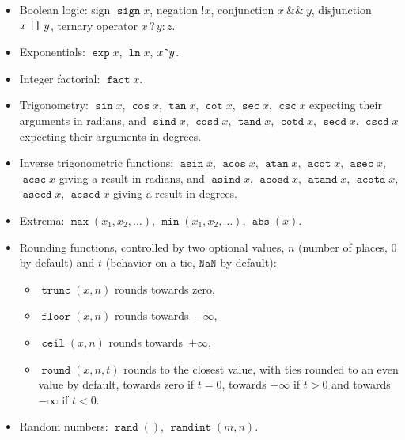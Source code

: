 \documentclass{ltxguide}
\providecommand\fpop[1]{\mathop{\texttt{#1}}}
\providecommand\fprel[1]{\mathrel{\texttt{#1}}}
\providecommand\nan{\texttt{NaN}}
\begin{document}
\begin{itemize}
    The relation $x\fprel{?}y$ is true exactly if one or both operands is~\nan{} or is
   a tuple, unless they are equal tuples. Each 
   can be any (non-empty) combination of |<|, |=|, |>|, and~|?|, plus
   an optional leading~|!| (which negates the ), with
   the restriction that the negated  may not start with~|?|.
  \item Boolean logic: sign $\fpop{sign} x$,
    negation $\fpop{!}x$, conjunction
    $x\fprel{\&\&}y$, disjunction $x\fprel{\string|\string|}y$, ternary
    operator $x\fprel{?}y\fprel{:}z$.
  \item Exponentials: $\fpop{exp} x$, $\fpop{ln} x$, $x\mathord{\texttt{\^{}}}y$.
  \item Integer factorial: $\fpop{fact} x$.
  \item Trigonometry: $\fpop{sin} x$, $\fpop{cos} x$, $\fpop{tan} x$, $\fpop{cot} x$, $\fpop{sec}
    x$, $\fpop{csc} x$ expecting their arguments in radians, and
    $\fpop{sind} x$, $\fpop{cosd} x$,
    $\fpop{tand} x$, $\fpop{cotd} x$,
    $\fpop{secd} x$, $\fpop{cscd} x$ expecting their
    arguments in degrees.
  \item Inverse trigonometric functions: $\fpop{asin} x$,
    $\fpop{acos} x$, $\fpop{atan} x$,
    $\fpop{acot} x$, $\fpop{asec} x$,
    $\fpop{acsc} x$ giving a result in radians, and
    $\fpop{asind} x$, $\fpop{acosd} x$,
    $\fpop{atand} x$, $\fpop{acotd} x$,
    $\fpop{asecd} x$, $\fpop{acscd} x$ giving a result
    in degrees.
  \item Extrema: $\fpop{max}(x_{1},x_{2},\ldots)$, $\fpop{min}(x_{1},x_{2},\ldots)$,
    $\fpop{abs}(x)$.
  \item Rounding functions, controlled by two optional
    values,  $n$ (number of places, $0$ by default) and
      $t$ (behavior on a tie, $\nan$ by default):
    \begin{itemize}
    \item $\fpop{trunc}(x,n)$ rounds towards zero,
    \item $\fpop{floor}(x,n)$ rounds towards~$-\infty$,
    \item $\fpop{ceil}(x,n)$ rounds towards~$+\infty$,
    \item $\fpop{round}(x,n,t)$ rounds to the closest value, with
    ties rounded to an even value by default, towards zero if $t=0$,
    towards $+\infty$ if $t>0$ and towards $-\infty$ if $t<0$.
    \end{itemize}
  \item Random numbers: $\fpop{rand}()$, $\fpop{randint}(m,n)$.

\end{itemize}
\end{document}
